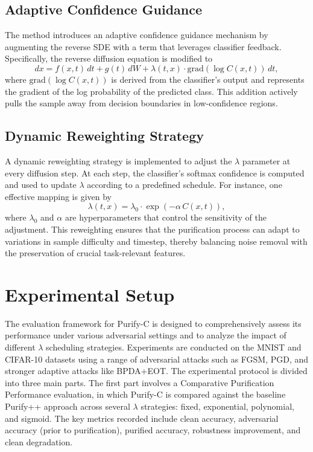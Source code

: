 \documentclass{article} %
\begin{document}
\subsection{Adaptive Confidence Guidance}
The method introduces an adaptive confidence guidance mechanism by augmenting the reverse SDE with a term that leverages classifier feedback. Specifically, the reverse diffusion equation is modified to 
\[
  dx = f(x,t)\,dt + g(t)\,dW + \lambda(t,x) \cdot \text{grad}(\log C(x,t))\,dt,
\]
where \(\text{grad}(\log C(x,t))\) is derived from the classifier's output and represents the gradient of the log probability of the predicted class. This addition actively pulls the sample away from decision boundaries in low-confidence regions.

\subsection{Dynamic Reweighting Strategy}
A dynamic reweighting strategy is implemented to adjust the $\lambda$ parameter at every diffusion step. At each step, the classifier's softmax confidence is computed and used to update $\lambda$ according to a predefined schedule. For instance, one effective mapping is given by 
\[
  \lambda(t,x) = \lambda_0 \cdot \exp(-\alpha\,C(x,t)),
\]
where \(\lambda_0\) and \(\alpha\) are hyperparameters that control the sensitivity of the adjustment. This reweighting ensures that the purification process can adapt to variations in sample difficulty and timestep, thereby balancing noise removal with the preservation of crucial task-relevant features.

\section{Experimental Setup}
\label{sec:experimental}
The evaluation framework for Purify-C is designed to comprehensively assess its performance under various adversarial settings and to analyze the impact of different $\lambda$ scheduling strategies. Experiments are conducted on the MNIST and CIFAR-10 datasets\citep{Liu2021} using a range of adversarial attacks such as FGSM\citep{Becker2011}, PGD\citep{Fan2021}, and stronger adaptive attacks like BPDA+EOT\citep{Efron2004}. The experimental protocol is divided into three main parts. The first part involves a Comparative Purification Performance evaluation, in which Purify-C is compared against the baseline Purify++ approach across several $\lambda$ strategies: fixed, exponential, polynomial, and sigmoid. The key metrics recorded include clean accuracy, adversarial accuracy (prior to purification), purified accuracy, robustness improvement, and clean degradation.
\end{document}
